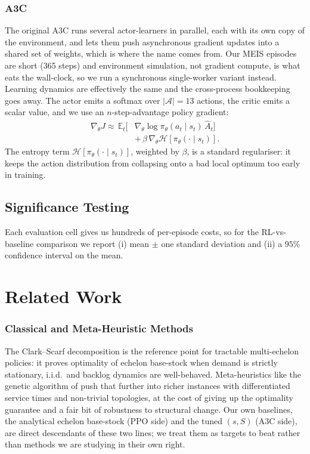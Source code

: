 \documentclass[letterpaper]{article} %
\begin{document}
\subsubsection{A3C}
The original A3C \citep{mnih2016a3c} runs several actor-learners
in parallel, each with its own copy of the environment, and lets
them push asynchronous gradient updates into a shared set of
weights, which is where the name comes from.  Our MEIS episodes
are short (\num{365} steps) and environment simulation, not
gradient compute, is what eats the wall-clock, so we run a
synchronous single-worker variant instead.  Learning dynamics are
effectively the same and the cross-process bookkeeping goes
away.  The actor emits a softmax over $|\mathcal{A}|{=}13$
actions, the critic emits a scalar value, and we use an
$n$-step-advantage policy gradient:
\begin{equation}
\begin{aligned}
\nabla_\theta J \approx\,
  \mathbb{E}_t\big[&\nabla_\theta\log\pi_\theta(a_t\mid s_t)\,\hat A_t\big]\\
  &+\,\beta\,\nabla_\theta \mathcal{H}[\pi_\theta(\cdot\mid s_t)].
\end{aligned}
\label{eq:a3cpg}
\end{equation}
The entropy term $\mathcal{H}[\pi_\theta(\cdot\mid s_t)]$,
weighted by $\beta$, is a standard regulariser: it keeps the
action distribution from collapsing onto a bad local optimum too
early in training.

\subsection{Significance Testing}
Each evaluation cell gives us hundreds of per-episode costs, so
for the RL-vs-baseline comparison we report (i) mean $\pm$ one
standard deviation and (ii) a $95\%$ confidence interval on the
mean.

\section{Related Work}
\label{sec:rel}

\subsubsection{Classical and Meta-Heuristic Methods}
The Clark--Scarf decomposition \citep{clark1960optimal} is the
reference point for tractable multi-echelon policies: it proves
optimality of echelon base-stock when demand is strictly
stationary, i.i.d.\ and backlog dynamics are well-behaved.
Meta-heuristics like the genetic algorithm of
\citet{grahl2016meta} push that further into richer instances
with differentiated service times and non-trivial topologies, at
the cost of giving up the optimality guarantee and a fair bit of
robustness to structural change.  Our own baselines, the
analytical echelon base-stock (PPO side) and the tuned $(s,S)$
(A3C side), are direct descendants of these two lines; we treat
them as targets to beat rather than methods we are studying in
their own right.
\end{document}
